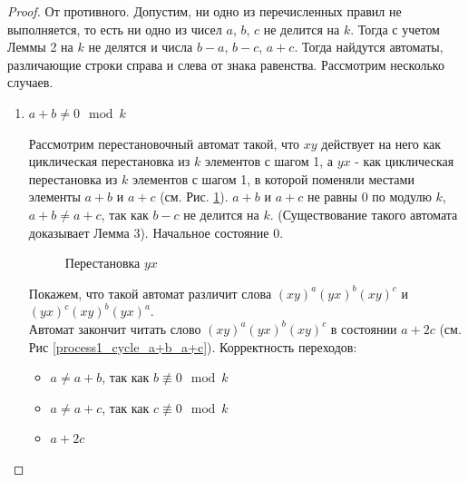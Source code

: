 \documentclass{article}
\begin{document}
	\begin{proof}
		От противного. Допустим, ни одно из перечисленных правил не выполняется, то есть ни одно из чисел $a$, $b$, $c$ не делится на $k$. Тогда с учетом Леммы 2 на $k$ не делятся и числа $b-a$, $b-c$, $a+c$. Тогда найдутся автоматы, различающие строки справа и слева от знака равенства. Рассмотрим несколько случаев.
		
		\begin{enumerate}
			\item $a+b \ne 0 \mod k$
			
			Рассмотрим перестановочный автомат такой, что $xy$ действует на него как циклическая перестановка из $k$ элементов с шагом 1, а $yx$ - как циклическая перестановка из $k$ элементов с шагом 1, в которой поменяли местами элементы $a+b$ и $a+c$ (см. Рис. \ref{cycle_a+b_a+c}). $a+b$ и $a+c$ не равны 0 по модулю $k$, $a+b \ne a+c$, так как $b-c$ не делится на $k$. (Существование такого автомата доказывает Лемма 3). Начальное состояние 0.
			
			\begin{figure}
				\caption{Перестановка $yx$}
				\label{cycle_a+b_a+c}
			\end{figure}
		
			Покажем, что такой автомат различит слова $(xy)^a(yx)^b(xy)^c$ и $(yx)^c(xy)^b(yx)^a$.\\
			
			Автомат закончит читать слово $(xy)^a(yx)^b(xy)^c$ в состоянии $a+2c$ (см. Рис \ref{process1_cycle_a+b_a+c}).
			Корректность переходов:
			\begin{itemize}
				\item $a \ne a+b$, так как $b \not \equiv 0 \mod k$
				\item $a \ne a+c$, так как $c \not \equiv 0 \mod k$
				\item $a+2c$
			\end{itemize}
			

\end{enumerate}
\end{proof}
\end{document}
